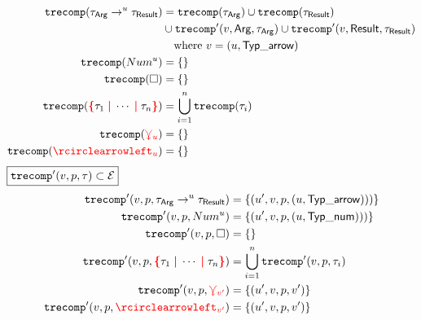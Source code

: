 \begin{align*}
  \trecomp{\arrowTyp{\tau_\ArrowArg}{u}{\tau_\ArrowResult}}
  &= \trecomp{\tau_\ArrowArg}
  \cup \trecomp{\tau_\ArrowResult} \\
  &\cup \trecompPrime{v}{\ArrowArg}{\tau_\ArrowArg}
  \cup \trecompPrime{v}{\ArrowResult}{\tau_\ArrowResult} \\
  &\quad\text{where } v = (u, \TypArrow)
  \\
  \trecomp{\numTyp{u}} &= \{\}
  \\
  \trecomp{\hole} &= \{\}
  \\
  \trecomp{\conflictHole{\tau_1, \cdots, \tau_n}}
  &= \bigcup_{i=1}^n \trecomp{\tau_i}
  \\
  \trecomp{\multiVertex{u}} &= \{\}
  \\
  \trecomp{\cycleVertex{u}} &= \{\}
\end{align*}
%
$\boxed{\operatorname{\operatorname{\texttt{trecomp}}^\prime}\mathopen{}\left(v, p, \tau\right)\mathclose{} \subset \mathcal{E}}$
%
\begin{align*}
  \trecompPrime{v}{p}{\arrowTyp{\tau_\ArrowArg}{u}{\tau_\ArrowResult}}
  &= \{(u', v, p, (u, \TypArrow)))\}
  \\
  \trecompPrime{v}{p}{\numTyp{u}}
  &= \{(u', v, p, (u, \TypNum)))\}
  \\
  \trecompPrime{v}{p}{\hole} &= \{\}
  \\
  \trecompPrime{v}{p}{\conflictHole{\tau_1, \cdots, \tau_n}}
  &= \bigcup_{i=1}^n \trecompPrime{v}{p}{\tau_i}
  \\
  \trecompPrime{v}{p}{\multiVertex{v'}}
  &= \{(u', v, p, v')\}
  \\
  \trecompPrime{v}{p}{\cycleVertex{v'}}
  &= \{(u', v, p, v')\}
\end{align*}





